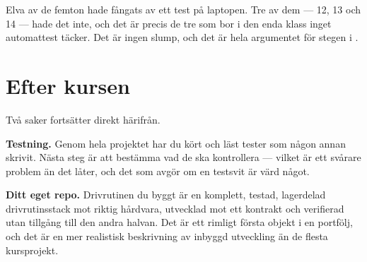 \begin{aside}
\note Elva av de femton hade fångats av ett test på laptopen. Tre av dem --- 12, 13 och 14 ---
hade det inte, och det är precis de tre som bor i den enda klass inget automattest täcker. Det är
ingen slump, och det är hela argumentet för stegen i .
\end{aside}

\section{Efter kursen}

Två saker fortsätter direkt härifrån.

\textbf{Testning.} Genom hela projektet har du kört och läst tester som någon annan skrivit. Nästa
steg är att bestämma vad de ska kontrollera --- vilket är ett svårare problem än det låter, och
det som avgör om en testsvit är värd något.

\textbf{Ditt eget repo.} Drivrutinen du byggt är en komplett, testad, lagerdelad drivrutinsstack
mot riktig hårdvara, utvecklad mot ett kontrakt och verifierad utan tillgång till den andra halvan.
Det är ett rimligt första objekt i en portfölj, och det är en mer realistisk beskrivning av
inbyggd utveckling än de flesta kursprojekt.
